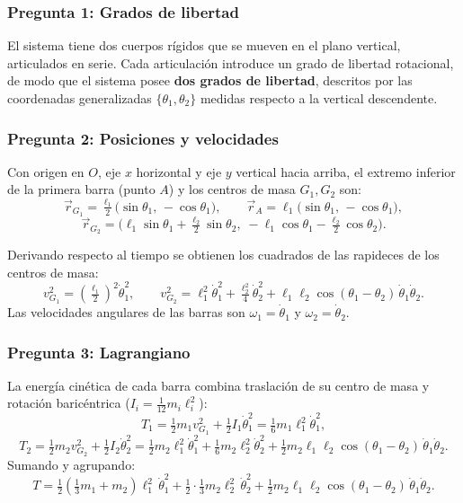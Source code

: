 \begin{sol}

\subsubsection*{Pregunta 1: Grados de libertad}

El sistema tiene dos cuerpos rígidos que se mueven en el plano vertical, articulados en
serie. Cada articulación introduce un grado de libertad rotacional, de modo que el sistema
posee \textbf{dos grados de libertad}, descritos por las coordenadas generalizadas
$\{\theta_1,\theta_2\}$ medidas respecto a la vertical descendente.

\subsubsection*{Pregunta 2: Posiciones y velocidades}

Con origen en $O$, eje $x$ horizontal y eje $y$ vertical hacia arriba, el extremo inferior
de la primera barra (punto $A$) y los centros de masa $G_1,G_2$ son:
$$\vec{r}_{G_1} = \tfrac{\ell_1}{2}\big(\sin\theta_1,\,-\cos\theta_1\big),\qquad
\vec{r}_{A} = \ell_1\big(\sin\theta_1,\,-\cos\theta_1\big),$$
$$\vec{r}_{G_2} = \Big(\ell_1\sin\theta_1 + \tfrac{\ell_2}{2}\sin\theta_2,\;
-\ell_1\cos\theta_1 - \tfrac{\ell_2}{2}\cos\theta_2\Big).$$

Derivando respecto al tiempo se obtienen los cuadrados de las rapideces de los centros de
masa:
$$v_{G_1}^2 = \left(\tfrac{\ell_1}{2}\right)^2\dot\theta_1^2,\qquad
v_{G_2}^2 = \ell_1^2\dot\theta_1^2 + \tfrac{\ell_2^2}{4}\dot\theta_2^2
+ \ell_1\ell_2\cos(\theta_1-\theta_2)\,\dot\theta_1\dot\theta_2.$$
Las velocidades angulares de las barras son $\omega_1=\dot\theta_1$ y $\omega_2=\dot\theta_2$.

\subsubsection*{Pregunta 3: Lagrangiano}

La energía cinética de cada barra combina traslación de su centro de masa y rotación
baricéntrica ($I_i=\tfrac{1}{12}m_i\ell_i^2$):
$$T_1 = \tfrac12 m_1 v_{G_1}^2 + \tfrac12 I_1\dot\theta_1^2 = \tfrac16 m_1\ell_1^2\dot\theta_1^2,$$
$$T_2 = \tfrac12 m_2 v_{G_2}^2 + \tfrac12 I_2\dot\theta_2^2
= \tfrac12 m_2\ell_1^2\dot\theta_1^2 + \tfrac16 m_2\ell_2^2\dot\theta_2^2
+ \tfrac12 m_2\ell_1\ell_2\cos(\theta_1-\theta_2)\,\dot\theta_1\dot\theta_2.$$
Sumando y agrupando:
$$T = \tfrac12\left(\tfrac13 m_1 + m_2\right)\ell_1^2\,\dot\theta_1^2
+ \tfrac12\cdot\tfrac13 m_2\ell_2^2\,\dot\theta_2^2
+ \tfrac12 m_2\ell_1\ell_2\cos(\theta_1-\theta_2)\,\dot\theta_1\dot\theta_2.$$


\end{sol}
